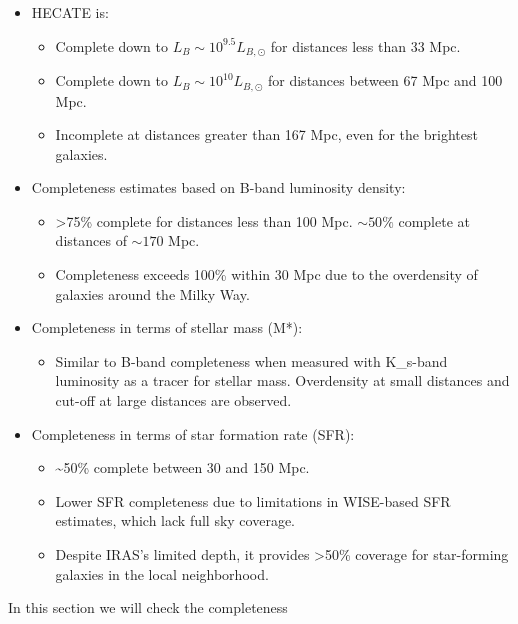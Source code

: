 \documentclass[
]{article}
\providecommand{\tightlist}{%
  \setlength{\itemsep}{0pt}\setlength{\parskip}{0pt}}\usepackage{longtable,booktabs,array}
\begin{document}
\begin{itemize}
\item
  HECATE is:

  \begin{itemize}
  \item
    Complete down to \(L_B\sim 10^{9.5} L_{B,\odot}\) for distances less
    than 33 Mpc.
  \item
    Complete down to \(L_B\sim 10^{10} L_{B,\odot}\) for distances
    between 67 Mpc and 100 Mpc.
  \item
    Incomplete at distances greater than 167 Mpc, even for the brightest
    galaxies.
  \end{itemize}
\item
  Completeness estimates based on B-band luminosity density:

  \begin{itemize}
  \item
    \textgreater75\% complete for distances less than 100 Mpc.
    \(\sim 50\%\) complete at distances of \(\sim170\) Mpc.
  \item
    Completeness exceeds 100\% within 30 Mpc due to the overdensity of
    galaxies around the Milky Way.
  \end{itemize}
\item
  Completeness in terms of stellar mass (M*):

  \begin{itemize}
  \tightlist
  \item
    Similar to B-band completeness when measured with K\_s-band
    luminosity as a tracer for stellar mass. Overdensity at small
    distances and cut-off at large distances are observed.
  \end{itemize}
\item
  Completeness in terms of star formation rate (SFR):

  \begin{itemize}
  \item
    \textasciitilde50\% complete between 30 and 150 Mpc.
  \item
    Lower SFR completeness due to limitations in WISE-based SFR
    estimates, which lack full sky coverage.
  \item
    Despite IRAS's limited depth, it provides \textgreater50\% coverage
    for star-forming galaxies in the local neighborhood.
  \end{itemize}
\end{itemize}

In this section we will check the completeness
\end{document}
